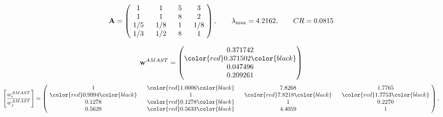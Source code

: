\begin{example}
\begin{equation*}
\mathbf{A} =
\begin{pmatrix}
$\,\,$ 1 $\,\,$ & $\,\,$1$\,\,$ & $\,\,$5$\,\,$ & $\,\,$3 $\,\,$ \\
$\,\,$ 1 $\,\,$ & $\,\,$ 1 $\,\,$ & $\,\,$8$\,\,$ & $\,\,$2 $\,\,$ \\
$\,\,$ 1/5$\,\,$ & $\,\,$ 1/8$\,\,$ & $\,\,$ 1 $\,\,$ & $\,\,$ 1/8 $\,\,$ \\
$\,\,$ 1/3$\,\,$ & $\,\,$ 1/2$\,\,$ & $\,\,$8$\,\,$ & $\,\,$ 1  $\,\,$ \\
\end{pmatrix},
\qquad
\lambda_{\max} =
4.2162,
\qquad
CR = 0.0815
\end{equation*}

\begin{equation*}
\mathbf{w}^{AMAST} =
\begin{pmatrix}
0.371742\\
\color{red} 0.371502\color{black} \\
0.047496\\
0.209261
\end{pmatrix}\end{equation*}
\begin{equation*}
\left[ \frac{{w}^{AMAST}_i}{{w}^{AMAST}_j} \right] =
\begin{pmatrix}
$\,\,$ 1 $\,\,$ & $\,\,$\color{red} 1.0006\color{black} $\,\,$ & $\,\,$7.8268$\,\,$ & $\,\,$1.7765$\,\,$ \\
$\,\,$\color{red} 0.9994\color{black} $\,\,$ & $\,\,$ 1 $\,\,$ & $\,\,$\color{red} 7.8218\color{black} $\,\,$ & $\,\,$\color{red} 1.7753\color{black}   $\,\,$ \\
$\,\,$0.1278$\,\,$ & $\,\,$\color{red} 0.1278\color{black} $\,\,$ & $\,\,$ 1 $\,\,$ & $\,\,$0.2270 $\,\,$ \\
$\,\,$0.5629$\,\,$ & $\,\,$\color{red} 0.5633\color{black} $\,\,$ & $\,\,$4.4059$\,\,$ & $\,\,$ 1  $\,\,$ \\
\end{pmatrix},
\end{equation*}


\end{example}
